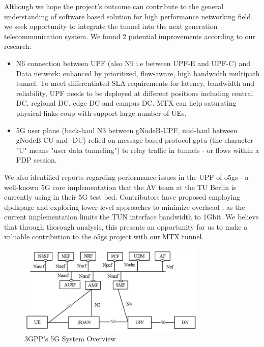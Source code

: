 Although we hope the project's outcome can contribute to the general understanding of software based solution for high performance networking field, we seek opportunity to integrate the tunnel into the next generation telecommunication system. We found 2 potential improvements according to our research: 
\begin{itemize}
    \item N6 connection between UPF (also N9 i.e between UPF-E and UPF-C) and Data network: enhanced by prioritized, flow-aware, high bandwidth multipath tunnel. To meet differentiated SLA requirements for latency, bandwidth and reliability, UPF needs to be deployed at different positions including central DC, regional DC, edge DC and campus DC. MTX can help saturating physical links coup with support large number of UEs.
    \item 5G user plane (back-haul N3 between gNodeB-UPF, mid-haul between gNodeB-CU and -DU) relied on message-based protocol \ac{gptu} (the character "U" means "user data tunneling") to relay traffic in tunnels - or flows within a PDP session.
\end{itemize}

We also identified reports regarding performance issues in the \ac{UPF} of \ac{o5gs} - a well-known 5G core implementation that the AV team at the TU Berlin is currently using in their 5G test bed. Contributors have proposed employing \ac{dpdkpage} and exploring lower-level approaches to minimize overhead \cite{open5gs_github_dpdk}\cite{open5gs_github_udp_perf_cap}, as the current implementation limits the TUN interface bandwidth to 1Gbit. We believe that through thorough analysis, this presents an opportunity for us to make a valuable contribution to the \ac{o5gs} project with our MTX tunnel.

\begin{figure}[H]
	\centering
	\includegraphics[width=0.8\textwidth]{resources/images/3gpp_5g_system_overview.png}
	\caption{3GPP's 5G System Overview \cite{3gpp_5g_system_overview}}
    \label{fig:introduction:3gpp_5g_system_overview}
\end{figure}


